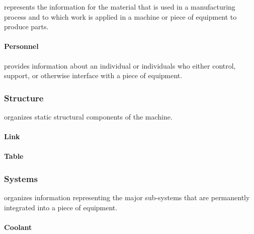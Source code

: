  represents the information for the material that is used in a manufacturing process and to which work is applied in a machine or piece of equipment to produce parts.


\paragraph{Personnel}\mbox{}
\label{sec:Personnel}



 provides information about an individual or individuals who either control, support, or otherwise interface with a piece of equipment.



\subsubsection{Structure}
\label{sec:Structure}



 organizes static structural components of the machine.

\FloatBarrier

\paragraph{Link}\mbox{}
\label{sec:Link}






\paragraph{Table}\mbox{}
\label{sec:Table}






\subsubsection{Systems}
\label{sec:Systems}



 organizes information representing the major sub-systems that are permanently integrated into a piece of equipment.

\FloatBarrier

\paragraph{Coolant}\mbox{}
\label{sec:Coolant}



